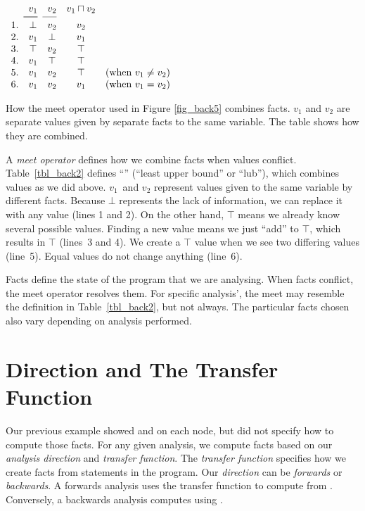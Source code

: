 \documentclass[12pt]{report}
\begin{document}
\begin{table}[tbh]
  \centering
  \figbegin
  \begin{math}
    \begin{array}{ccccc}
      & v_1 & v_2 & v_1 \sqcap v_2 \\
      \cmidrule(r){2-2}\cmidrule(r){2-2}\cmidrule(r){3-3}
      1. & \bot & v_2 & v_2 & \\ 
      2. & v_1 & \bot & v_1 & \\
      3. & \top & v_2 & \top & \\
      4. & v_1 & \top & \top  &\\
      5. & v_1 & v_2 & \top & \text{(when $v_1 \neq v_2$)}\\
      6. & v_1 & v_2 & v_1 & \text{(when $v_1 = v_2$)}
    \end{array}
  \end{math}
  \caption{How the meet operator used in
    Figure \ref{fig_back5} combines facts. $v_1$ and $v_2$ are
    separate values given by separate facts to the same variable. The
    table shows how they are combined.}
  \label{tbl_back2}
  \figend
\end{table}

A \emph{meet operator} defines how we combine facts when values
conflict. Table~\ref{tbl_back2} defines ``\raisebox{.1em}{$\sqcap$}''
(``least upper bound'' or ``lub''), which combines values as we did
above. $v_1$~and $v_2$ represent values given to the same variable by
different facts. Because $\bot$ represents the lack of information, we
can replace it with any value (lines 1 and 2). On the other hand,
$\top$ means we already know several possible values. Finding a new
value means we just ``add'' to $\top$, which results in $\top$
(lines~3 and 4). We create a $\top$ value when we see two differing
values (line~5). Equal values do not change anything (line~6).

Facts define the state of the program that we are analysing. When
facts conflict, the meet operator resolves them. For specific
analysis', the meet may resemble the definition in
Table~\ref{tbl_back2}, but not always. The particular facts chosen
also vary depending on analysis performed.

\section{Direction and The Transfer Function}
\label{sec_back5}
Our previous example showed \inE and \out on each
node, but did not specify how to compute those facts. For any given
analysis, we compute facts based on our \emph{analysis direction} and
\emph{transfer function}. The \emph{transfer function} specifies how we 
create facts from statements in the program. Our \emph{direction} can 
be \emph{forwards} or \emph{backwards}. A forwards analysis uses 
the transfer function to compute \out from \inE. Conversely,
a backwards analysis computes \inE using \out. 
\end{document}
